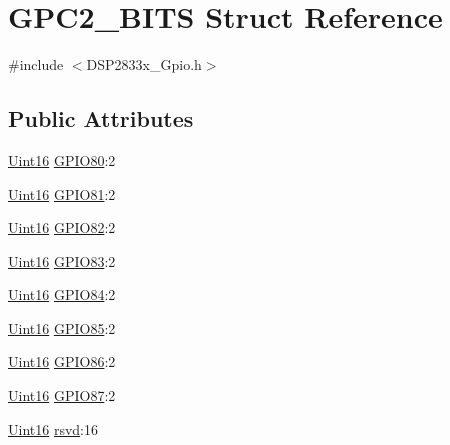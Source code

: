 \hypertarget{struct_g_p_c2___b_i_t_s}{}\section{G\+P\+C2\+\_\+\+B\+I\+T\+S Struct Reference}
\label{struct_g_p_c2___b_i_t_s}


{\ttfamily \#include $<$D\+S\+P2833x\+\_\+\+Gpio.\+h$>$}

\subsection*{Public Attributes}
\begin{DoxyCompactItemize}
\item 
\hyperlink{_d_s_p2833x___device_8h_a59a9f6be4562c327cbfb4f7e8e18f08b}{Uint16} \hyperlink{struct_g_p_c2___b_i_t_s_a1631207e7636e0ae26b57634eed22b25}{G\+P\+I\+O80}\+:2
\item 
\hyperlink{_d_s_p2833x___device_8h_a59a9f6be4562c327cbfb4f7e8e18f08b}{Uint16} \hyperlink{struct_g_p_c2___b_i_t_s_a94fabd0eacd0a20aad4f12a9df2d7e0b}{G\+P\+I\+O81}\+:2
\item 
\hyperlink{_d_s_p2833x___device_8h_a59a9f6be4562c327cbfb4f7e8e18f08b}{Uint16} \hyperlink{struct_g_p_c2___b_i_t_s_a754dca42fb98fe7e1ea5669ab7e0b493}{G\+P\+I\+O82}\+:2
\item 
\hyperlink{_d_s_p2833x___device_8h_a59a9f6be4562c327cbfb4f7e8e18f08b}{Uint16} \hyperlink{struct_g_p_c2___b_i_t_s_a47468f12c9228875bcb1fcdd4f5ac147}{G\+P\+I\+O83}\+:2
\item 
\hyperlink{_d_s_p2833x___device_8h_a59a9f6be4562c327cbfb4f7e8e18f08b}{Uint16} \hyperlink{struct_g_p_c2___b_i_t_s_a2f60c850e507621ad1bdcf5444829222}{G\+P\+I\+O84}\+:2
\item 
\hyperlink{_d_s_p2833x___device_8h_a59a9f6be4562c327cbfb4f7e8e18f08b}{Uint16} \hyperlink{struct_g_p_c2___b_i_t_s_a419248a27ec8d4bc6d43cb98d9eb93d5}{G\+P\+I\+O85}\+:2
\item 
\hyperlink{_d_s_p2833x___device_8h_a59a9f6be4562c327cbfb4f7e8e18f08b}{Uint16} \hyperlink{struct_g_p_c2___b_i_t_s_a51099c7bb3a765aa72779b565c7a1853}{G\+P\+I\+O86}\+:2
\item 
\hyperlink{_d_s_p2833x___device_8h_a59a9f6be4562c327cbfb4f7e8e18f08b}{Uint16} \hyperlink{struct_g_p_c2___b_i_t_s_a9c1322fbac1f58523ef4b61135b106a7}{G\+P\+I\+O87}\+:2
\item 
\hyperlink{_d_s_p2833x___device_8h_a59a9f6be4562c327cbfb4f7e8e18f08b}{Uint16} \hyperlink{struct_g_p_c2___b_i_t_s_a35d73a467a0e30d316fb4e2917586241}{rsvd}\+:16
\end{DoxyCompactItemize}


